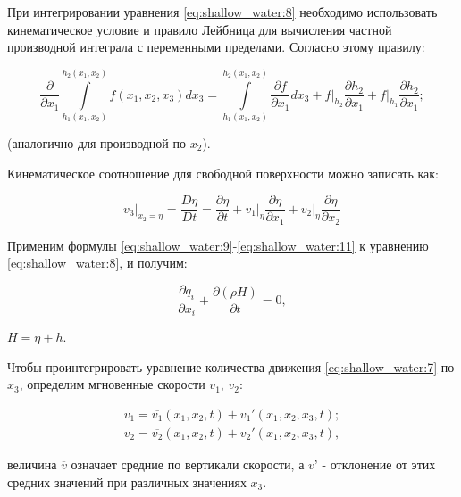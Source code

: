 \documentclass[14pt]{extreport}
\begin{document}
При интегрировании уравнения \ref{eq:shallow_water:8} необходимо использовать кинематическое условие и правило Лейбница \cite{bib:calc:zorich} для вычисления частной производной интеграла с переменными пределами. Согласно этому правилу:


\begin{equation}\label{eq:shallow_water:10}
\frac{\partial}{\partial x_1} \int\limits^{h_2(x_1,x_2)}_{h_1(x_1,x_2)} f(x_1, x_2, x_3) dx_3=\int\limits^{h_2(x_1,x_2)}_{h_1(x_1,x_2)} \frac{\partial f}{\partial x_1} dx_3 + f \bigg|_{h_2}  \frac{\partial h_2}{\partial x_1} + f \bigg|_{h_1} \frac{\partial h_2}{\partial x_1};
\end{equation}

\noindent(аналогично для производной по $x_2$).

Кинематическое соотношение для свободной поверхности можно записать как:

\begin{equation}\label{eq:shallow_water:11}
v_3\bigg|_{x_2=\eta} = \frac{D\eta}{Dt} = \frac{\partial \eta}{\partial t} + v_1 \bigg|_{\eta} \frac{\partial \eta}{\partial x_1} + v_2 \bigg|_{\eta}\frac{\partial \eta}{\partial x_2}
\end{equation}

Применим формулы \ref{eq:shallow_water:9}-\ref{eq:shallow_water:11} к уравнению \ref{eq:shallow_water:8}, и получим:

\begin{equation}\label{eq:shallow_water:12}
\frac{ \partial q_i}{\partial x_i} + \frac{\partial(\rho H)}{\partial t} = 0,
\end{equation}

 $H=\eta+h$.

Чтобы проинтегрировать уравнение количества движения \ref{eq:shallow_water:7} по $x_3$, определим мгновенные скорости $v_1$, $v_2$:

\begin{equation}\label{eq:shallow_water:13}
\begin{aligned}
v_1 = \overline{v_1} (x_1, x_2, t) + v_1'(x_1, x_2, x_3, t);\\
v_2 = \overline{v_2} (x_1, x_2, t) + v_2'(x_1, x_2, x_3, t),
\end{aligned}
\end{equation}

 величина $\overline{v}$ означает средние по вертикали скорости, а $v’$ - отклонение от этих средних значений при различных значениях $x_3$.
\end{document}

